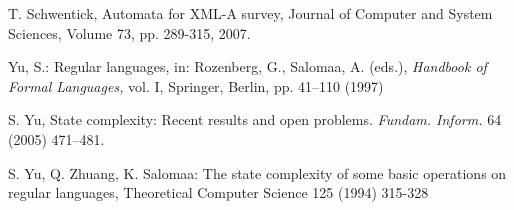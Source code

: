 \documentclass[copyright]{eptcs}
\begin{document}
\begin{thebibliography}{99}
{
T. Schwentick, Automata for XML-A survey, Journal of Computer and
System Sciences, Volume 73, pp. 289-315, 2007. \vspace*{-2mm}

  Yu, S.: Regular languages,
in:  Rozenberg, G.,  Salomaa, A. (eds.), {\em  Handbook of Formal
Languages,} vol. I, Springer, Berlin, pp.  41--110 (1997)

 S. Yu, State complexity: Recent results
and open problems. {\em Fundam. Inform.} 64 (2005) 471--481.

S. Yu, Q. Zhuang, K. Salomaa: The state complexity of some basic
operations on regular languages, Theoretical Computer Science 125
(1994) 315-328
} 
\end{thebibliography}
\end{document}
